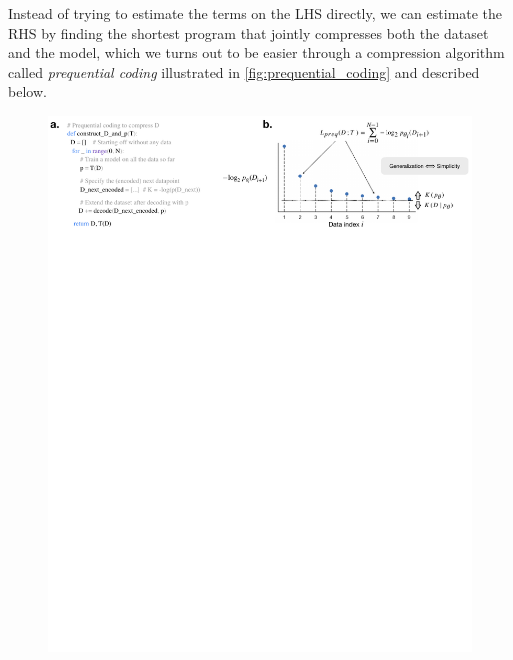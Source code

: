 \documentclass{article} %
\begin{document}
\begin{appendices}
Instead of trying to estimate the terms on the LHS directly, we can estimate the RHS by finding the shortest program that jointly compresses both the dataset and the model, which we turns out to be easier through a compression algorithm called \textit{prequential coding} illustrated in \cref{fig:prequential_coding} and described below.

\begin{figure}[ht]
    \centering
    \includegraphics[width=\linewidth]{figures/prequential_coding.pdf}

\end{figure}
\end{appendices}
\end{document}
